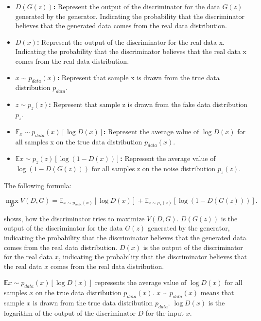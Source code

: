 \begin{itemize}
    \item \textbf{ $D(G(z))$:} Represent the output of the discriminator for the data $G(z)$ generated by 
    the generator. Indicating the probability that the discriminator believes that the generated 
    data comes from the real data distribution.
    \item \textbf{$D(x)$:} Represent the output of the discriminator for the real data x. Indicating the probability that 
    the discriminator believes that the real data x comes from the real data distribution.
    \item \textbf{ $x \sim p_{data}(x)$:} Represent that sample x is drawn from the true data distribution $p_{data}$.
    \item \textbf{ $z \sim p_{z}(z)$:} Represent that sample z is drawn from the fake data distribution $p_{z}$.
    \item \textbf{$\mathbb{E}{_x \sim p_{data}(x)}[\log D(x)]$:} Represent the average value of $\log D(x)$ 
    for all samples x on the true data distribution $p_{data}(x)$.
    \item \textbf{$\mathbb{E}{x \sim p_{z}(z)}[\log (1 - D(x))]$:} Represent the average value of $\log (1 - D(G(z)))$ 
    for all samples z on the noise distribution $p_z(z)$.
\end{itemize}


The following formula:

\begin{equation}
    \label{eq:max}
    \max_{D} V(D, G) = \mathbb{E}_{x \sim p_{data}(x)} [\log D(x)] + \mathbb{E}_{z \sim p_{z}(z)} [\log(1 - D(G(z)))].
\end{equation}

shows, how the discriminator tries to maximize $V(D, G)$. $D(G(z))$ is the output of the discriminator for the data $G(z)$ generated by the generator, 
indicating the probability that the discriminator believes that the generated data comes from the real data distribution.
$D(x)$ is the output of the discriminator for the real data $x$, 
indicating the probability that the discriminator believes that the real data $x$ comes from the real data distribution.

$\mathbb{E}{x \sim p_{data}(x)}[\log D(x)]$ represents the average value of $\log D(x)$ for all samples $x$ on the true data distribution $p_{data}(x)$.
$x \sim p_{data}(x)$ means that sample $x$ is drawn from the true data distribution $p_{data}$.
$\log D(x)$ is the logarithm of the output of the discriminator $D$ for the input $x$.




